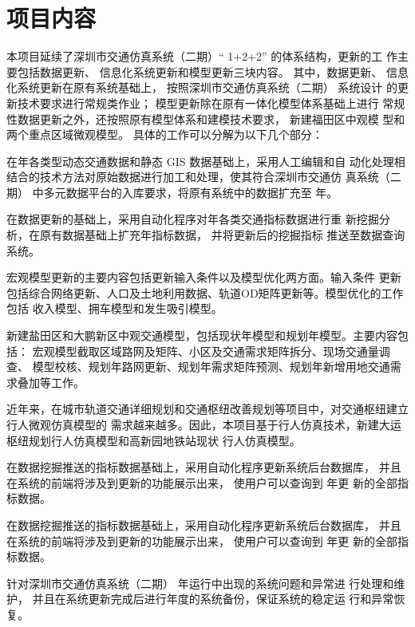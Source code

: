 \section{项目内容}
本项目延续了深圳市交通仿真系统（二期）“ 1+2+2” 的体系结构，更新的工
作主要包括数据更新、 信息化系统更新和模型更新三块内容。 其中，数据更新、
信息化系统更新在原有系统基础上， 按照深圳市交通仿真系统（二期） 系统设计
的更新技术要求进行常规类作业； 模型更新除在原有一体化模型体系基础上进行
常规性数据更新之外，还按照原有模型体系和建模技术要求， 新建福田区中观模
型和两个重点区域微观模型。 具体的工作可以分解为以下几个部分：

在\pyear 年各类型动态交通数据和静态 GIS 数据基础上，采用人工编辑和自
动化处理相结合的技术方法对原始数据进行加工和处理，使其符合深圳市交通仿
真系统（二期） 中多元数据平台的入库要求，将原有系统中的数据扩充至 \pyear
年。

在数据更新的基础上，采用自动化程序对\pyear 年各类交通指标数据进行重
新挖掘分析，在原有数据基础上扩充\pyear 年指标数据， 并将更新后的挖掘指标
推送至数据查询系统。

宏观模型更新的主要内容包括更新输入条件以及模型优化两方面。输入条件
更新包括综合网络更新、人口及土地利用数据、轨道OD矩阵更新等。模型优化的工作包括
收入模型、拥车模型和发生吸引模型。

新建盐田区和大鹏新区中观交通模型，包括现状年模型和规划年模型。主要内容包括：
宏观模型截取区域路网及矩阵、小区及交通需求矩阵拆分、现场交通量调查、
模型校核、规划年路网更新、规划年需求矩阵预测、规划年新增用地交通需求叠加等工作。

近年来，在城市轨道交通详细规划和交通枢纽改善规划等项目中，对交通枢纽建立行人微观仿真模型的
需求越来越多。因此，本项目基于行人仿真技术，新建大运枢纽规划行人仿真模型和高新园地铁站现状
行人仿真模型。

在数据挖掘推送的指标数据基础上，采用自动化程序更新系统后台数据库，
并且在系统的前端将涉及到更新的功能展示出来， 使用户可以查询到 \pyear 年更
新的全部指标数据。

在数据挖掘推送的指标数据基础上，采用自动化程序更新系统后台数据库，
并且在系统的前端将涉及到更新的功能展示出来， 使用户可以查询到 \pyear 年更
新的全部指标数据。

针对深圳市交通仿真系统（二期） \pyear 年运行中出现的系统问题和异常进
行处理和维护， 并且在系统更新完成后进行年度的系统备份，保证系统的稳定运
行和异常恢复。

